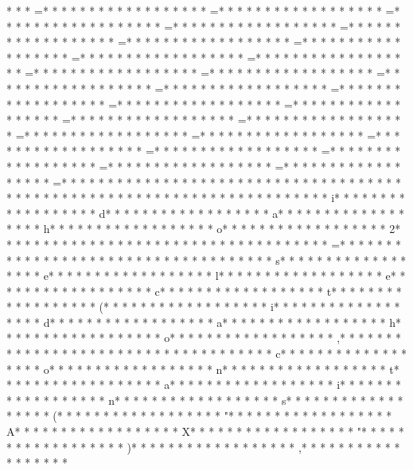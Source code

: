 * *  * =* * *  * * *  * * *  *  * * *  *  * * *  * =* * *  * * *  * * *  *  * * *  *  * * *  * =* * *  * * *  * * *  *  * * *  *  * * *  * =* * *  * * *  * * *  *  * * *  *  * * *  * =* * *  * * *  * * *  *  * * *  *  * * *  * =* * *  * * *  * * *  *  * * *  *  * * *  * =* * *  * * *  * * *  *  * * *  *  * * *  * =* * *  * * *  * * *  *  * * *  *  * * *  * =* * *  * * *  * * *  *  * * *  *  * * *  * =* * *  * * *  * * *  *  * * *  *  * * *  * =* * *  * * *  * * *  *  * * *  *  * * *  * =* * *  * * *  * * *  *  * * *  *  * * *  * =* * *  * * *  * * *  *  * * *  *  * * *  * =* * *  * * *  * * *  *  * * *  *  * * *  * =* * *  * * *  * * *  *  * * *  *  * * *  * =* * *  * * *  * * *  *  * * *  *  * * *  * =* * *  * * *  * * *  *  * * *  *  * * *  * =* * *  * * *  * * *  *  * * *  *  * * *  * =* * *  * * *  * * *  *  * * *  *  * * *  * =* * *  * * *  * * *  *  * * *  *  * * *  * =* * *  * * *  * * *  *  * * *  *  * * *  * =* * *  * * *  * * *  *  * * *  *  * * *  * =* * *  * * *  * * *  *  * * *  *  * * *  * =* * *  * * *  * * *  *  * * *  *  * * *  * =* * *  * * *  * * *  *  * * *  *  * * *  * =* * *  * * *  * * *  *  * * *  *  * * *  *  * * *  * * *  * * *  *  * * *  *  * * *  * %
* * *  * * *  * * *  *  * * *  *  * * *  * 
* * *  * * *  * * *  *  * * *  *  * * *  * i* * *  * * *  * * *  *  * * *  *  * * *  * d* * *  * * *  * * *  *  * * *  *  * * *  * a* * *  * * *  * * *  *  * * *  *  * * *  * h* * *  * * *  * * *  *  * * *  *  * * *  * o* * *  * * *  * * *  *  * * *  *  * * *  * 2* * *  * * *  * * *  *  * * *  *  * * *  *  * * *  * * *  * * *  *  * * *  *  * * *  * =* * *  * * *  * * *  *  * * *  *  * * *  *  * * *  * * *  * * *  *  * * *  *  * * *  * s* * *  * * *  * * *  *  * * *  *  * * *  * e* * *  * * *  * * *  *  * * *  *  * * *  * l* * *  * * *  * * *  *  * * *  *  * * *  * e* * *  * * *  * * *  *  * * *  *  * * *  * c* * *  * * *  * * *  *  * * *  *  * * *  * t* * *  * * *  * * *  *  * * *  *  * * *  * (* * *  * * *  * * *  *  * * *  *  * * *  * i* * *  * * *  * * *  *  * * *  *  * * *  * d* * *  * * *  * * *  *  * * *  *  * * *  * a* * *  * * *  * * *  *  * * *  *  * * *  * h* * *  * * *  * * *  *  * * *  *  * * *  * o* * *  * * *  * * *  *  * * *  *  * * *  * ,* * *  * * *  * * *  *  * * *  *  * * *  * 
* * *  * * *  * * *  *  * * *  *  * * *  * c* * *  * * *  * * *  *  * * *  *  * * *  * o* * *  * * *  * * *  *  * * *  *  * * *  * n* * *  * * *  * * *  *  * * *  *  * * *  * t* * *  * * *  * * *  *  * * *  *  * * *  * a* * *  * * *  * * *  *  * * *  *  * * *  * i* * *  * * *  * * *  *  * * *  *  * * *  * n* * *  * * *  * * *  *  * * *  *  * * *  * s* * *  * * *  * * *  *  * * *  *  * * *  * (* * *  * * *  * * *  *  * * *  *  * * *  * "* * *  * * *  * * *  *  * * *  *  * * *  * A* * *  * * *  * * *  *  * * *  *  * * *  * X* * *  * * *  * * *  *  * * *  *  * * *  * "* * *  * * *  * * *  *  * * *  *  * * *  * )* * *  * * *  * * *  *  * * *  *  * * *  * ,* * *  * * *  * * *  *  * * *  *  * * *  * 
